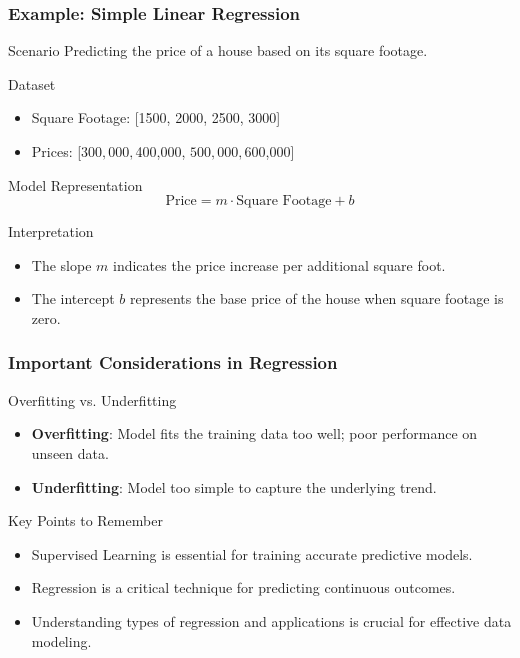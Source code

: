 \documentclass[aspectratio=169]{beamer}
\begin{document}
\begin{frame}[fragile]
    \frametitle{Example: Simple Linear Regression}
    \begin{block}{Scenario}
        Predicting the price of a house based on its square footage.
    \end{block}
    \begin{block}{Dataset}
        \begin{itemize}
            \item Square Footage: [1500, 2000, 2500, 3000]
            \item Prices: [$300,000, $400,000, $500,000, $600,000]
        \end{itemize}
    \end{block}
    \begin{block}{Model Representation}
        \begin{equation}
        \text{Price} = m \cdot \text{Square Footage} + b
        \end{equation}
    \end{block}
    \begin{block}{Interpretation}
        \begin{itemize}
            \item The slope \(m\) indicates the price increase per additional square foot.
            \item The intercept \(b\) represents the base price of the house when square footage is zero.
        \end{itemize}
    \end{block}
\end{frame}

\begin{frame}[fragile]
    \frametitle{Important Considerations in Regression}
    \begin{block}{Overfitting vs. Underfitting}
        \begin{itemize}
            \item \textbf{Overfitting}: Model fits the training data too well; poor performance on unseen data.
            \item \textbf{Underfitting}: Model too simple to capture the underlying trend.
        \end{itemize}
    \end{block}
    \begin{block}{Key Points to Remember}
        \begin{itemize}
            \item Supervised Learning is essential for training accurate predictive models.
            \item Regression is a critical technique for predicting continuous outcomes.
            \item Understanding types of regression and applications is crucial for effective data modeling.
        \end{itemize}
    \end{block}
\end{frame}
\end{document}
